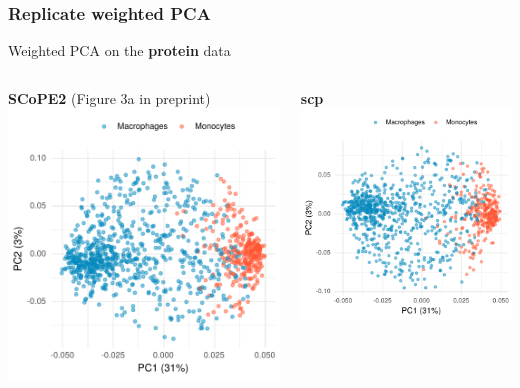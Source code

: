 \documentclass{beamer}
\newcommand{\frametitlesection}[1]{\frametitle{\centering #1 \footnotesize \hspace{0pt plus 1 filll} \insertsection}}
\begin{document}
\begin{frame}
    \frametitlesection{Replicate weighted PCA}

    Weighted PCA on the \textbf{protein} data

    \bigskip

    \begin{columns}
        \small
        \begin{column}{0.5\textwidth}
            \textbf{SCoPE2} (Figure 3a in preprint)
            \includegraphics[width=\textwidth]{figs/wPCA_SCoPE2.pdf}
        \end{column}
        \begin{column}{0.5\textwidth}
            \textbf{scp}
            \includegraphics[width=\textwidth]{figs/wPCA_scp.pdf}

\end{column}
\end{columns}
\end{frame}
\end{document}
